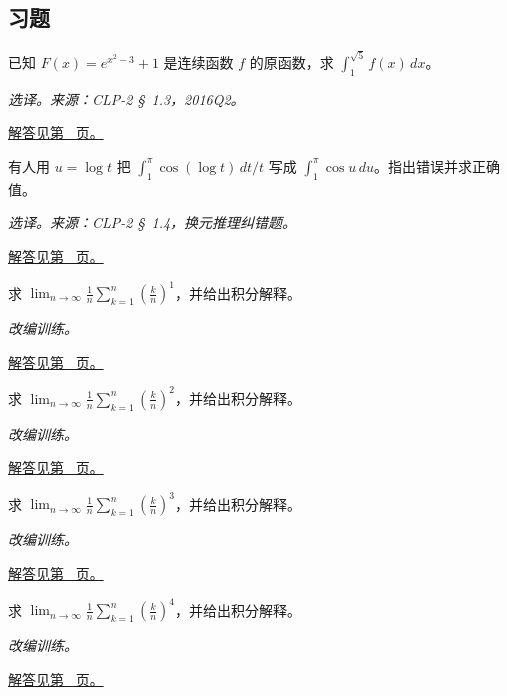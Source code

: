 \documentclass[12pt,fontset=fandol]{ctexart}
\begin{document}
\subsection{习题}
\begin{example}[由原函数信息计算定积分]\label{ex:c17q1}
已知 $F(x)=e^{x^2-3}+1$ 是连续函数 $f$ 的原函数，求 $\int_1^{\sqrt5}f(x)\,dx$。
\par\textit{选译。来源：CLP-2 \S~1.3，2016Q2。}\par\hyperref[ans:c17q1]{解答见第~\pageref{ans:c17q1} 页。}
\end{example}
\begin{example}[纠正换元后的上下限]\label{ex:c17q2}
有人用 $u=\log t$ 把 $\int_1^\pi \cos(\log t)\,dt/t$ 写成 $\int_1^\pi\cos u\,du$。指出错误并求正确值。
\par\textit{选译。来源：CLP-2 \S~1.4，换元推理纠错题。}\par\hyperref[ans:c17q2]{解答见第~\pageref{ans:c17q2} 页。}
\end{example}
\begin{example}[黎曼和的识别]\label{ex:c17q3}
求 $\displaystyle\lim_{n\to\infty}\frac1n\sum_{k=1}^n\left(\frac kn\right)^{1}$，并给出积分解释。
\par\textit{改编训练。}\par\hyperref[ans:c17q3]{解答见第~\pageref{ans:c17q3} 页。}
\end{example}
\begin{example}[黎曼和的识别]\label{ex:c17q4}
求 $\displaystyle\lim_{n\to\infty}\frac1n\sum_{k=1}^n\left(\frac kn\right)^{2}$，并给出积分解释。
\par\textit{改编训练。}\par\hyperref[ans:c17q4]{解答见第~\pageref{ans:c17q4} 页。}
\end{example}
\begin{example}[黎曼和的识别]\label{ex:c17q5}
求 $\displaystyle\lim_{n\to\infty}\frac1n\sum_{k=1}^n\left(\frac kn\right)^{3}$，并给出积分解释。
\par\textit{改编训练。}\par\hyperref[ans:c17q5]{解答见第~\pageref{ans:c17q5} 页。}
\end{example}
\begin{example}[黎曼和的识别]\label{ex:c17q6}
求 $\displaystyle\lim_{n\to\infty}\frac1n\sum_{k=1}^n\left(\frac kn\right)^{4}$，并给出积分解释。
\par\textit{改编训练。}\par\hyperref[ans:c17q6]{解答见第~\pageref{ans:c17q6} 页。}
\end{example}
\end{document}
